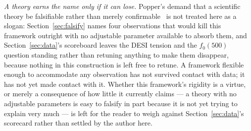 \documentclass[pdflatex,sn-mathphys-num]{sn-jnl}
\theoremstyle{thmstyleone}
\theoremstyle{thmstylethree}
\theoremstyle{thmstyletwo}
\begin{document}
\emph{A theory earns the name only if it can lose.} Popper's demand that
a scientific theory be falsifiable rather than merely confirmable~\cite{Popper1959}
is not treated here as a slogan: Section~\ref{sec:falsify} names four
observations that would kill this framework outright with no adjustable
parameter available to absorb them, and Section~\ref{sec:data}'s
scoreboard leaves the DESI tension and the $f_0(500)$ question standing
rather than retuning anything to make them disappear, because nothing in
this construction is left free to retune. A framework flexible enough to
accommodate any observation has not survived contact with data; it has
not yet made contact with it. Whether this framework's rigidity is a
virtue, or merely a consequence of how little it currently claims — a
theory with no adjustable parameters is easy to falsify in part because
it is not yet trying to explain very much — is left for the reader to
weigh against Section~\ref{sec:data}'s scorecard rather than settled by
the author here.
\end{document}

